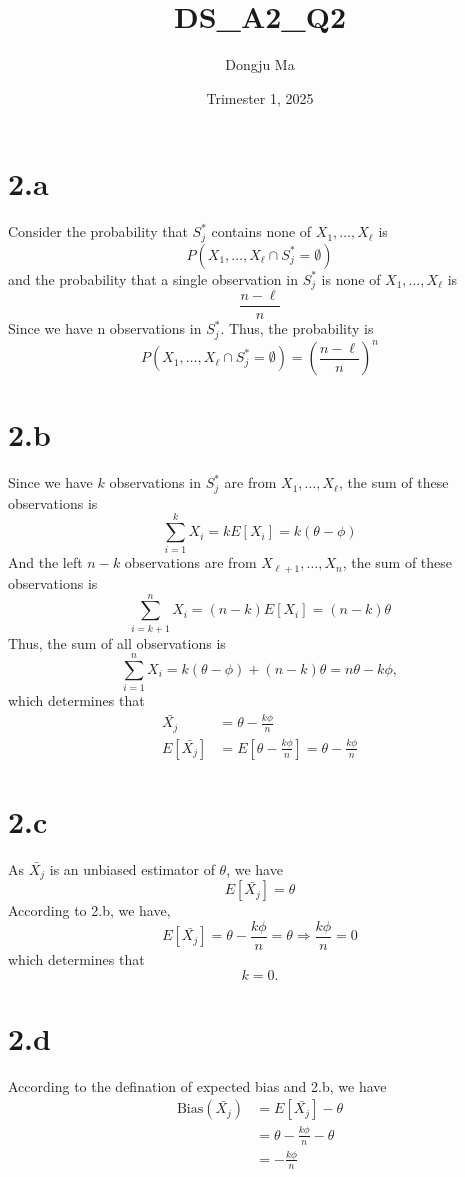 \documentclass{article}
\title{DS\_A2\_Q2}
\author{Dongju Ma}
\date{Trimester 1, 2025}
\begin{document}
\maketitle

\section*{2.a}
Consider the probability that \(S_j^{*}\) contains none of \(X_1, \dots, X_\ell\) is 
\[
    P({X_1, \dots, X_\ell} \cap S_j^{*} = \emptyset)
\] 
and the probability that a single observation in \(S_j^{*}\) is none of \(X_1, \dots, X_\ell\) is
\[
    \frac{n-\ell}{n}
\]
Since we have n observations in \(S_j^{*}\).
Thus, the probability is
\[
    P({X_1, \dots, X_\ell} \cap S_j^{*} = \emptyset) = \left( \frac{n-\ell}{n} \right)^n
\]

\section*{2.b}
Since we have \(k\) observations in \(S_j^{*}\) are from \(X_1, \dots, X_\ell\), the sum of these observations is
\[
    \sum_{i=1}^{k} X_i = k E[X_i] = k (\theta - \phi )
\]
And the left \(n-k\) observations are from \(X_{\ell+1}, \dots, X_n\), the sum of these observations is
\[
    \sum_{i=k+1}^{n} X_i = (n-k) E[X_i] = (n-k) \theta
\]
Thus, the sum of all observations is
\[
    \sum_{i=1}^{n} X_i = k (\theta - \phi) + (n-k) \theta = n \theta - k \phi,
\]
which determines that
\begin{align*}
    \bar{X_j} &= \theta - \frac{k \phi} {n} \\
    E[\bar{X_j}] &= E[\theta - \frac{k \phi} {n}] = \theta - \frac{k \phi} {n}
\end{align*}


\section*{2.c}
As \(\bar{X_j}\) is an unbiased estimator of \(\theta\), we have
\[
    E[\bar{X_j}] = \theta
\]
According to 2.b, we have,
\[
    E[\bar{X_j}] = \theta - \frac{k \phi} {n} = \theta \Rightarrow \frac{k \phi}{n} = 0 
\]
which determines that
\[
    k = 0.
\]

\section*{2.d}
According to the defination of expected bias and 2.b, we have
\begin{align*}
    \text{Bias}(\bar{X_j}) &= E[\bar{X_j}] - \theta \\
    &= \theta - \frac{k \phi} {n} - \theta \\
    &= - \frac{k \phi} {n}
\end{align*}
\end{document}
